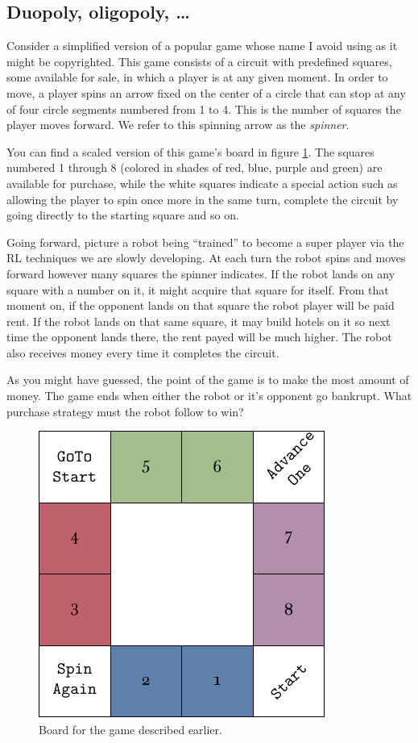 \subsection{Duopoly, oligopoly, \ldots}
Consider a simplified version of a popular game whose name I 
avoid using as it might be copyrighted. This game consists of a 
circuit with predefined squares, some available for sale, in 
which a player is at any given moment. In order to move, a 
player spins an arrow fixed on the center of a circle that can 
stop at any of four circle segments numbered from 1 to 4. This 
is the number of squares the player moves forward. We refer to 
this spinning arrow as the \textit{spinner}.

You can find a scaled version of this game's board in figure 
\ref{fig:miniopoly-board}. The squares numbered 1 through 8 
(colored in shades of red, blue, purple and green) are 
available for purchase, while the white squares indicate a 
special action such as allowing the player to spin once more in 
the same turn, complete the circuit by going directly to the 
starting square and so on.

Going forward, picture a robot being ``trained'' to become a 
super player via the RL techniques we are slowly developing. At 
each turn the robot spins and moves forward however many 
squares the spinner indicates. If the robot lands on any square 
with a number on it, it might acquire that square for itself. 
From that moment on, if the opponent lands on that square the 
robot player will be paid rent. If the robot lands on that same 
square, it may build hotels on it so next time the opponent 
lands there, the rent payed will be much higher. The robot also 
receives money every time it completes the circuit.

As you might have guessed, the point of the game is to make the 
most amount of money. The game ends when either the robot or 
it's opponent go bankrupt. What purchase strategy must the 
robot follow to win?
\begin{figure}[h]
	\centering
	\includegraphics[width=.65\textwidth]{img/board.pdf}
	\caption{Board for the game described earlier.}
	\label{fig:miniopoly-board}
\end{figure}

